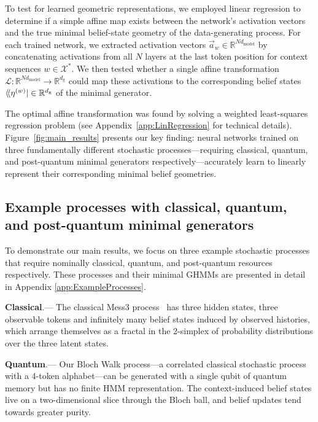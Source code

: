 \documentclass[prx,nofootinbib,onecolumn,showkeys,groupaddress,preprintnumbers,floatfix,
superscriptaddress]{revtex4-1}
\newcommand{\dbra}[1]{\bra{ \! \langle #1}}
\newcommand{\act}[1][w]{\vec{a}_{#1}} %
\begin{document}
To test for learned geometric representations, we employed 
linear regression
to determine if a simple affine map exists between the network's activation vectors and the true minimal belief-state geometry of the data-generating process. For each trained network, we extracted activation vectors $\act[w] \in \mathbb{R}^{N d_\text{model}}$ by concatenating activations from all $N$ layers 
at the last token position
for context sequences $w \in \mathcal{X}^*$. We then tested whether a single affine transformation $\mathcal{L}: \mathbb{R}^{N d_\text{model}} \to \mathbb{R}^{d_\text{g}}$ could map these activations to the corresponding belief states %
$\dbra{\eta^{(w)}} \in \mathbb{R}^{d_\text{g}}$ of the minimal generator.

The optimal affine transformation was found by solving a weighted least-squares regression problem (see Appendix~\ref{app:LinRegression} for technical details). Figure~\ref{fig:main_results} presents our key finding: neural networks trained on three fundamentally different stochastic processes---requiring classical, quantum, and post-quantum minimal generators respectively---accurately learn to linearly represent their corresponding minimal belief geometries.

\subsection{Example processes with classical, quantum, and post-quantum minimal generators}

To demonstrate our main results, we focus on three example stochastic processes that require nominally classical, quantum, and post-quantum resources respectively.
 These processes and their minimal GHMMs are presented in detail in Appendix \ref{app:ExampleProcesses}.
 
\textbf{Classical}.--- The classical Mess3 process~\cite{Marz17a, Shai24_Transformers, Piotrowski25_Constrained}
 has three hidden states, three observable tokens and infinitely many belief states induced by observed histories, which arrange themselves as a fractal in the 2-simplex of probability distributions over the three latent states.

\textbf{Quantum}.---
 Our Bloch Walk process---a correlated classical stochastic process with a 4-token alphabet---can be generated with a single qubit of quantum memory but has no finite HMM representation.  The context-induced belief states live on a two-dimensional slice through the Bloch ball, and belief updates tend towards greater purity.  
\end{document}
